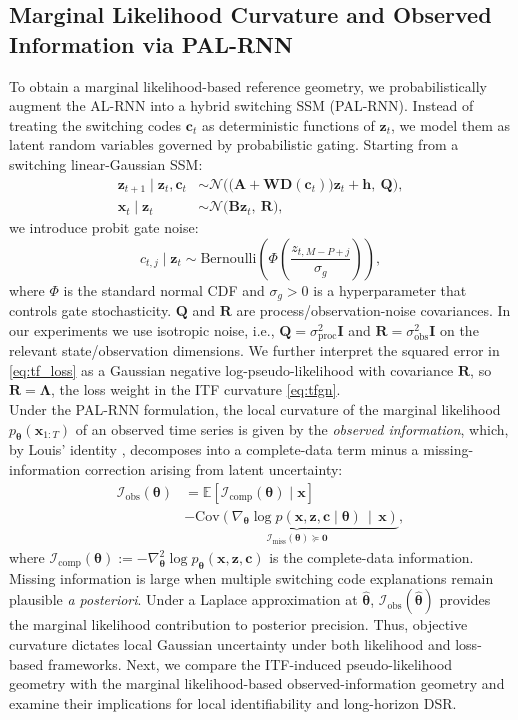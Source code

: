 \documentclass[twoside]{article}
\theoremstyle{plain}
\theoremstyle{definition}
\theoremstyle{remark}
\newcommand{\E}{\mathbb{E}}
\newcommand{\Cov}{\mathrm{Cov}}
\newcommand{\Io}{\bm{\mathcal{I}}_{\mathrm{obs}}}
\newcommand{\Ic}{\bm{\mathcal{I}}_{\mathrm{comp}}}
\newcommand{\Imiss}{\bm{\mathcal{I}}_{\mathrm{miss}}}
\begin{document}
\subsection{Marginal Likelihood Curvature and Observed Information via PAL-RNN}
To obtain a marginal likelihood-based reference geometry, we probabilistically augment the AL-RNN into a hybrid switching SSM (PAL-RNN). Instead of treating the switching codes $\bm{c}_t$ as deterministic functions of $\bm{z}_t$, we model them as latent random variables governed by probabilistic gating. Starting from a switching linear-Gaussian SSM:
\begin{align}
\label{eq:ssmtransition}
\bm{z}_{t+1}\mid \bm{z}_t,\bm{c}_t
&\sim
\mathcal{N}\!\Big(\big(\bm{A}+\bm{W}\bm{D}(\bm{c}_t)\big)\bm{z}_t+\bm{h},\ \bm{Q}\Big),\\
\bm{x}_t\mid \bm{z}_t
&\sim
\mathcal{N}\!\big(\bm{B}\bm{z}_t,\ \bm{R}\big),
\nonumber
\end{align}
we introduce probit gate noise:
\begin{equation}
\label{eq:probit}
c_{t,j}\mid \bm{z}_t
\sim
\mathrm{Bernoulli}\!\left(\Phi\!\left(\frac{z_{t,M-P+j}}{\sigma_g}\right)\right),
\end{equation}
where $\Phi$ is the standard normal CDF and $\sigma_g>0$ is a hyperparameter that controls gate stochasticity. $\bm Q$ and $\bm R$ are process/observation-noise covariances. In our experiments we use isotropic noise, i.e., $\bm Q=\sigma_{\mathrm{proc}}^2\bm I$ and $\bm R=\sigma_{\mathrm{obs}}^2\bm I$ on the relevant state/observation dimensions. We further interpret the squared error in \eqref{eq:tf_loss} as a Gaussian negative log-pseudo-likelihood with covariance $\bm R$, so $\bm R = \bm \Lambda$, the loss weight in the ITF curvature \eqref{eq:tfgn}.\\

Under the PAL-RNN formulation, the local curvature of the marginal likelihood $p_{\bm{\theta}}(\bm{x}_{1:T})$ of an observed time series is given by the \emph{observed information}, which, by Louis' identity \citep{louis1982}, decomposes into a complete-data term minus a missing-information correction arising from latent uncertainty:
\begin{align}
\Io(\bm\theta)
&=
\E\!\left[\Ic(\bm\theta)\mid \bm{x}\right]
\nonumber\\
&-
\underbrace{\Cov\!\left(
\nabla_{\bm\theta}\log p(\bm{x},\bm{z},\bm{c}\mid\bm\theta)
\,\middle|\,\bm{x}
\right)}_{\Imiss(\bm\theta)\succeq \bm{0}},
\label{eq:louis}
\end{align}
where $\Ic(\bm\theta):=-\nabla_{\bm\theta}^2 \log p_{\bm\theta}(\bm x,\bm z,\bm c)$ is the complete-data information. Missing information is large when multiple switching code explanations remain plausible \emph{a posteriori}. Under a Laplace approximation at $\hat{\bm\theta}$, $\Io(\hat{\bm\theta})$ provides the marginal likelihood contribution to posterior precision. Thus, objective curvature dictates local Gaussian uncertainty under both likelihood and loss-based frameworks. Next, we compare the ITF-induced pseudo-likelihood geometry with the marginal likelihood-based observed-information geometry and examine their implications for local identifiability and long-horizon DSR.
\vspace{-0.5em}
\end{document}
